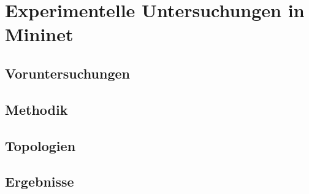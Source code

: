 \chapter{Experimentelle Untersuchungen in Mininet}

\section{Voruntersuchungen}

\section{Methodik}

\section{Topologien}

\section{Ergebnisse}